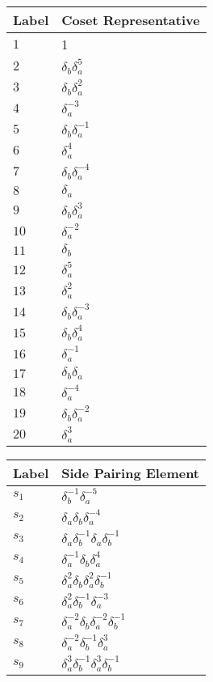 \documentclass{article}
\begin{document}
\begin{center}
\begin{tabular}{ll}
\toprule
Label & Coset Representative\\
\midrule
$1$ & 1 \\
$2$ & $\delta_b^{}\delta_a^{5}$ \\
$3$ & $\delta_b^{}\delta_a^{2}$ \\
$4$ & $\delta_a^{-3}$ \\
$5$ & $\delta_b^{}\delta_a^{-1}$ \\
$6$ & $\delta_a^{4}$ \\
$7$ & $\delta_b^{}\delta_a^{-4}$ \\
$8$ & $\delta_a^{}$ \\
$9$ & $\delta_b^{}\delta_a^{3}$ \\
$10$ & $\delta_a^{-2}$ \\
$11$ & $\delta_b^{}$ \\
$12$ & $\delta_a^{5}$ \\
$13$ & $\delta_a^{2}$ \\
$14$ & $\delta_b^{}\delta_a^{-3}$ \\
$15$ & $\delta_b^{}\delta_a^{4}$ \\
$16$ & $\delta_a^{-1}$ \\
$17$ & $\delta_b^{}\delta_a^{}$ \\
$18$ & $\delta_a^{-4}$ \\
$19$ & $\delta_b^{}\delta_a^{-2}$ \\
$20$ & $\delta_a^{3}$ \\
\bottomrule
\end{tabular}
\hfill
\begin{tabular}{ll}
\toprule
Label & Side Pairing Element\\
\midrule
$s_{1}$ & $\delta_b^{-1}\delta_a^{-5}$ \\
$s_{2}$ & $\delta_a^{}\delta_b^{}\delta_a^{-4}$ \\
$s_{3}$ & $\delta_a^{}\delta_b^{-1}\delta_a^{}\delta_b^{-1}$ \\
$s_{4}$ & $\delta_a^{-1}\delta_b^{}\delta_a^{4}$ \\
$s_{5}$ & $\delta_a^{2}\delta_b^{}\delta_a^{2}\delta_b^{-1}$ \\
$s_{6}$ & $\delta_a^{2}\delta_b^{-1}\delta_a^{-3}$ \\
$s_{7}$ & $\delta_a^{-2}\delta_b^{}\delta_a^{-2}\delta_b^{-1}$ \\
$s_{8}$ & $\delta_a^{-2}\delta_b^{-1}\delta_a^{3}$ \\
$s_{9}$ & $\delta_a^{3}\delta_b^{-1}\delta_a^{3}\delta_b^{-1}$ \\

\end{tabular}
\end{center}
\end{document}
